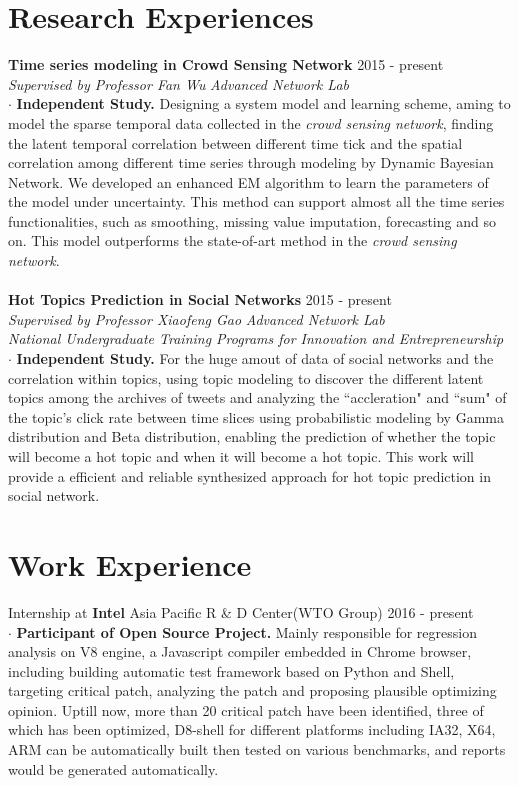 \documentclass[a4paper,10pt]{article}
\begin{document}
\begin{CJK}{GBK}{song}
\section{Research Experiences}
\textbf{Time series modeling in Crowd Sensing Network} \hfill 2015 - present\\
\emph{Supervised by Professor Fan Wu}   \hfill \emph{Advanced Network Lab}\\
$\cdot$ \textbf{Independent Study.} Designing a system model and learning scheme, aming to model the sparse temporal data collected in the \emph{crowd sensing network},  finding the latent temporal correlation between different time tick and the spatial correlation among different time series through modeling by Dynamic Bayesian Network. We developed an enhanced EM algorithm to learn the parameters of the model under uncertainty. This method can support almost all the time series functionalities, such as smoothing, missing value imputation, forecasting and so on. This model outperforms the state-of-art method in the \emph{crowd sensing network}.\\\\
\textbf{Hot Topics Prediction in Social Networks} \hfill 2015 - present\\
\emph{Supervised by Professor Xiaofeng Gao} \hfill \emph{Advanced Network Lab}\\
\emph{National Undergraduate Training Programs for Innovation and Entrepreneurship}\\
$\cdot$ \textbf{Independent Study.} For the huge amout of data of social networks and the correlation within topics, using topic modeling to discover the different latent topics among the archives of tweets and analyzing the ``accleration" and ``sum" of the topic's click rate between time slices using probabilistic modeling by Gamma distribution and Beta distribution, enabling the prediction of whether the topic will become a hot topic and when it will become a hot topic. This work will provide a efficient and reliable synthesized approach for hot topic prediction in social network.

\section{Work Experience}
Internship at \textbf{Intel} Asia Pacific R \& D Center(WTO Group) \hfill 2016 - present\\
$\cdot$ \textbf{Participant of Open Source Project.} Mainly responsible for regression analysis on V8 engine, a Javascript compiler embedded in Chrome browser, including building automatic test framework based on Python and Shell, targeting critical patch, analyzing the patch and proposing plausible optimizing opinion. Uptill now, more than 20 critical patch have been identified, three of which has been optimized, D8-shell for different platforms including IA32, X64, ARM can be automatically built then tested on various benchmarks, and reports would be generated automatically.


\end{CJK}
\end{document}
